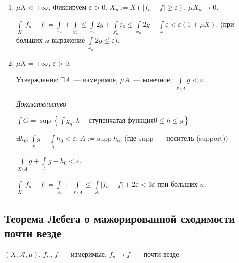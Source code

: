 \documentclass{article}
\begin{document}
                \begin{enumerate}
                
                    \item $\mu X < +\infty$. Фиксируем $\varepsilon > 0$. $X_n := X(|f_n - f| \geqslant \varepsilon)$, $\mu X_n \rightarrow 0$.
                    
                        $\int\limits_X |f_n - f| = \int\limits_{x_n} + \int\limits_{x_n^c} \leqslant \int\limits_{x_n} 2g + \int\limits_{x_n^c} \varepsilon_0 \leqslant \int\limits_{x_n} 2g + \int\limits_x \varepsilon < \varepsilon (1 + \mu X)$. (при больших $n$ выражение $\int\limits_{x_n} 2g \leqslant \varepsilon$).
                        
                    \item $\mu X = +\infty$, $\varepsilon > 0$. 
                    
                        Утверждение: $\exists A$~--- измеримое, $\mu A$~--- конечное, $\int\limits_{X \setminus A} g < \varepsilon$.
                    
                        \textit{Доказательство}
                        
                            $\int G = \sup \left\{ \int g_n : h - \text{ступенчатая функция} 0 \leqslant h \leqslant g \right\}$
                            
                        $\exists h_0 : \int\limits_X g - \int\limits_X h_0 < \varepsilon$, $A := \mathrm{supp \ } h_0$. (где supp~--- носитель (support))
                        
                        $\int\limits_{X \setminus A} g + \int\limits_A g - h_0 < \varepsilon$.
                        
                        $\int\limits_X |f_n - f| = \int\limits_A + \int\limits_{X \setminus A} \leqslant \int\limits_A |f_n - f| + 2 \varepsilon < 3 \varepsilon$ при больших $n$.
                        
                \end{enumerate}
                
        \subsection{Теорема Лебега о мажорированной сходимости почти везде}
        
            $(X, \mathcal{A}, \mu)$, $f_n$, $f$~--- измеримые, $f_n \rightarrow f$~--- почти везде.
            
\end{document}
